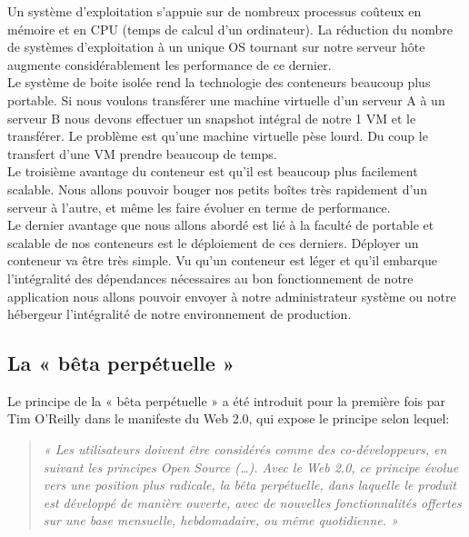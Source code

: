 \documentclass{report}
\begin{document}
        Un système d’exploitation s’appuie sur de nombreux processus coûteux en mémoire et en CPU (temps de calcul d’un ordinateur). La réduction du nombre de systèmes d’exploitation à un unique OS tournant sur notre serveur hôte augmente considérablement les performance de ce dernier.\\

        Le système de boite isolée rend la technologie des conteneurs beaucoup plus portable. Si nous voulons transférer une machine virtuelle d’un serveur A à un serveur B nous devons effectuer un snapshot intégral de notre 1 VM et le transférer. Le problème est qu’une machine virtuelle pèse lourd. Du coup le transfert d’une VM prendre beaucoup de temps.\\

        Le troisième avantage du conteneur est qu’il est beaucoup plus facilement scalable. Nous allons pouvoir bouger nos petits boîtes très rapidement d’un serveur à l’autre, et même les faire évoluer en terme de performance.\\

        Le dernier avantage que nous allons abordé est lié à la faculté de portable et scalable de nos conteneurs est le déploiement de ces derniers. Déployer un conteneur va être très simple. Vu qu’un conteneur est léger et qu’il embarque l’intégralité des dépendances nécessaires au bon fonctionnement de notre application nous allons pouvoir envoyer à notre administrateur système ou notre hébergeur l’intégralité de notre environnement de production.

      \subsection{La « bêta perpétuelle »}
      Le principe de la « bêta perpétuelle » a été introduit pour la première fois par Tim O’Reilly dans le manifeste du Web 2.0, qui expose le principe selon lequel:\\
      \begin{quotation}
        \emph{« Les utilisateurs doivent être considérés comme des co-développeurs, en suivant les principes Open Source (…). Avec le Web 2.0, ce principe évolue vers une position plus radicale, la bêta perpétuelle, dans laquelle le produit est développé de manière ouverte, avec de nouvelles fonctionnalités offertes sur une base mensuelle, hebdomadaire, ou même quotidienne. »}\\
      \end{quotation}
\end{document}
